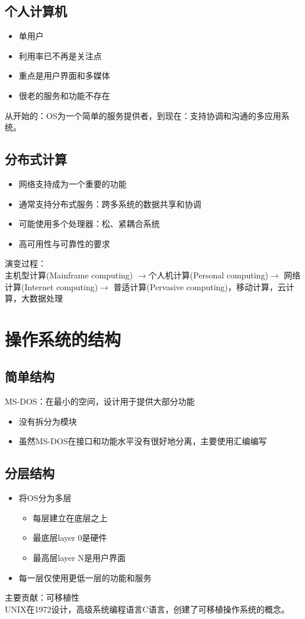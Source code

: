 \subsection{个人计算机}
\begin{itemize}
	\item 单用户
	\item 利用率已不再是关注点
	\item 重点是用户界面和多媒体
	\item 很老的服务和功能不存在
\end{itemize}
从开始的：OS为一个简单的服务提供者，到现在：支持协调和沟通的多应用系统。
\subsection{分布式计算}
\begin{itemize}
	\item 网络支持成为一个重要的功能
	\item 通常支持分布式服务：跨多系统的数据共享和协调
	\item 可能使用多个处理器：松、紧耦合系统
	\item 高可用性与可靠性的要求
\end{itemize}
演变过程：\\
主机型计算(Mainframe computing) $\rightarrow$个人机计算(Personal computing)$\rightarrow$  网络计算(Internet computing)$\rightarrow$ 普适计算(Pervasive computing)，移动计算，云计算，大数据处理
\section{操作系统的结构}
\subsection{简单结构}
MS-DOS：在最小的空间，设计用于提供大部分功能
\begin{itemize}
	\item 没有拆分为模块
	\item 虽然MS-DOS在接口和功能水平没有很好地分离，主要使用汇编编写
\end{itemize}
\subsection{分层结构}
\begin{itemize}
	\item 将OS分为多层
	\begin{itemize}
		\item 每层建立在底层之上
		\item 最底层layer 0是硬件
		\item 最高层layer N是用户界面
	\end{itemize}
	\item 每一层仅使用更低一层的功能和服务
\end{itemize}
主要贡献：可移植性\\
UNIX在1972设计，高级系统编程语言C语言，创建了可移植操作系统的概念。\\
